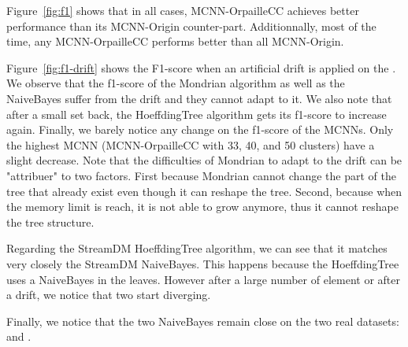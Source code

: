 Figure~\ref{fig:f1} shows that in all cases, MCNN-OrpailleCC achieves better
performance than its MCNN-Origin counter-part. Additionnally, most of the time,
any MCNN-OrpailleCC performs better than all MCNN-Origin.

Figure~\ref{fig:f1-drift} shows the F1-score when an artificial drift is
applied on the \banosdataset. We observe that the f1-score of the Mondrian
algorithm as well as the NaiveBayes suffer from the drift and they cannot adapt
to it. We also note that after a small set back, the HoeffdingTree algorithm
gets its f1-score to increase again. Finally, we barely notice any change on
the f1-score of the MCNNs. Only the highest MCNN (MCNN-OrpailleCC with 33, 40,
and 50 clusters) have a slight decrease.
Note that the difficulties of Mondrian to adapt to the drift can be "attribuer"
to two factors. First because Mondrian cannot change the part of the tree that
already exist even though it can reshape the tree. Second, because when the
memory limit is reach, it is not able to grow anymore, thus it cannot reshape
the tree structure.

Regarding the StreamDM HoeffdingTree algorithm, we can see that it matches very
closely the StreamDM NaiveBayes. This happens because the HoeffdingTree uses a
NaiveBayes in the leaves. However after a large number of element or after a
drift, we notice that two start diverging.

Finally, we notice that the two NaiveBayes remain close on the two real
datasets: \banosdataset and \recofitdataset.

